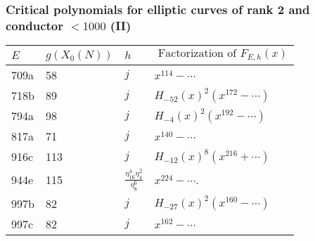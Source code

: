 \documentclass[handout]{beamer}
\begin{document}
\begin{frame}
\frametitle{Critical polynomials for elliptic curves of rank 2 and conductor $<1000$ (II)}   \begin{table}[h!]
    \begin{tabular}{ | l | l | l |p{4.4cm} |}
    \hline
    $E$ & $g(X_0(N))$    & $h$ & $\mbox{ Factorization of } F_{E,h}(x)$     \\ \hline \hline
    709a& 58  & $j$ &  $x^{114} - \cdots$\\ \hline
    718b& 89  & $j$ &  $ H_{-52}(x)^2 (x^{172} - \cdots)$\\ \hline
    794a& 98  & $j$ &  $H_{-4}(x)^2 (x^{192} - \cdots)$\\ \hline
    817a& 71  & $j$ &  $x^{140} - \cdots$\\ \hline
    
    916c & 113   & $j$ &$H_{-12}(x)^8(x^{216}+\cdots)$  \\ \hline
    
    
    944e & 115    & $\frac{\eta_{16}^4 \eta_{4}^2}{\eta_8^6}$ & $x^{224} - \cdots$.\footnotemark \\ \hline 
    997b& 82  & $j$ &  $H_{-27}(x)^2 (x^{160} - \cdots)$\\ \hline
    997c& 82  & $j$ &  $x^{162} - \cdots$\\ \hline
    \end{tabular}
    \label{table: rank two}	
   \end{table}
\end{frame}



\end{document}

